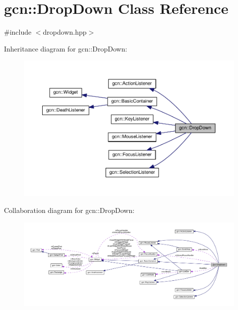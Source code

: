 \hypertarget{classgcn_1_1DropDown}{}\section{gcn\+:\+:Drop\+Down Class Reference}
\label{classgcn_1_1DropDown}


{\ttfamily \#include $<$dropdown.\+hpp$>$}



Inheritance diagram for gcn\+:\+:Drop\+Down\+:\nopagebreak
\begin{figure}[H]
\begin{center}
\leavevmode
\includegraphics[width=350pt]{classgcn_1_1DropDown__inherit__graph}
\end{center}
\end{figure}


Collaboration diagram for gcn\+:\+:Drop\+Down\+:\nopagebreak
\begin{figure}[H]
\begin{center}
\leavevmode
\includegraphics[width=350pt]{classgcn_1_1DropDown__coll__graph}
\end{center}
\end{figure}
